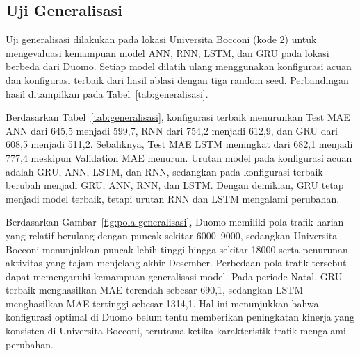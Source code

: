 \documentclass[conference,a4paper]{IEEEtran}
\begin{document}
\subsection{Uji Generalisasi}
Uji generalisasi dilakukan pada lokasi Universita Bocconi (kode 2) untuk mengevaluasi kemampuan model ANN, RNN, LSTM, dan GRU pada lokasi berbeda dari Duomo. Setiap model dilatih ulang menggunakan konfigurasi acuan dan konfigurasi terbaik dari hasil ablasi dengan tiga random seed. Perbandingan hasil ditampilkan pada Tabel~\ref{tab:generalisasi}.

\begin{table}[t]
\centering
\caption{Perbandingan MAE di Universita Bocconi}
\label{tab:generalisasi}
\end{table}

Berdasarkan Tabel~\ref{tab:generalisasi}, konfigurasi terbaik menurunkan Test MAE ANN dari 645,5 menjadi 599,7, RNN dari 754,2 menjadi 612,9, dan GRU dari 608,5 menjadi 511,2. Sebaliknya, Test MAE LSTM meningkat dari 682,1 menjadi 777,4 meskipun Validation MAE menurun. Urutan model pada konfigurasi acuan adalah GRU, ANN, LSTM, dan RNN, sedangkan pada konfigurasi terbaik berubah menjadi GRU, ANN, RNN, dan LSTM. Dengan demikian, GRU tetap menjadi model terbaik, tetapi urutan RNN dan LSTM mengalami perubahan.

Berdasarkan Gambar~\ref{fig:pola-generalisasi}, Duomo memiliki pola trafik harian yang relatif berulang dengan puncak sekitar 6000--9000, sedangkan Universita Bocconi menunjukkan puncak lebih tinggi hingga sekitar 18000 serta penurunan aktivitas yang tajam menjelang akhir Desember. Perbedaan pola trafik tersebut dapat memengaruhi kemampuan generalisasi model. Pada periode Natal, GRU terbaik menghasilkan MAE terendah sebesar 690,1, sedangkan LSTM menghasilkan MAE tertinggi sebesar 1314,1. Hal ini menunjukkan bahwa konfigurasi optimal di Duomo belum tentu memberikan peningkatan kinerja yang konsisten di Universita Bocconi, terutama ketika karakteristik trafik mengalami perubahan.
\end{document}
